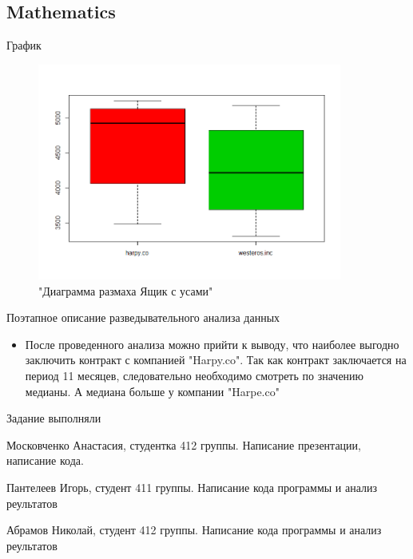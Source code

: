 \documentclass{beamer}
\begin{document}
\subsection{Mathematics}

\begin{frame}{График}

\begin{figure}
            \includegraphics[width=100mm]{Rplot.png}
            \caption{"Диаграмма размаха Ящик с усами"}
            \label{Graph}

\end{figure}
\end{frame}


\begin{frame}{Поэтапное описание разведывательного анализа данных}

\begin{itemize}
\item После проведенного анализа можно прийти к выводу, что наиболее выгодно заключить контракт с компанией "Harpy.co". Так как контракт заключается на период 11 месяцев, следовательно необходимо смотреть по значению медианы. А медиана больше у компании  "Harpe.co"

\end{itemize}

\end{frame}

\begin{frame}{Задание выполняли}
      \begin{itemize}
            {\small
            \item Московченко Анастасия, студентка 412 группы. Написание презентации, написание кода.
            \item Пантелеев Игорь, студент 411 группы. Написание кода программы и анализ реультатов
            \item Абрамов Николай, студент 412 группы. Написание кода программы и анализ реультатов}
            \end{itemize}
  \end{frame}
\end{document}
